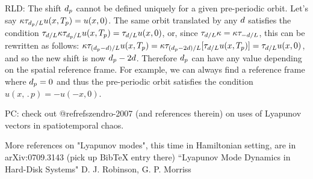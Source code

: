 RLD:{
    The shift $d_p$ cannot be defined
    uniquely for a given pre-periodic orbit.  Let's say
    $\kappa\tau_{d_p/L} u(x,{T_{p}}) = u(x,0)$.  The same
    orbit translated by any $d$ satisfies the condition
    $\tau_{d/L}\kappa\tau_{d_p/L} u(x,{T_{p}}) =
    \tau_{d/L}u(x,0)$, or, since $\tau_{d/L}\kappa = \kappa\tau_{-d/L}$,
    this can be rewritten as follows:
    $\kappa\tau_{(d_p - d)/L}u(x,{T_{p}}) =
    \kappa\tau_{(d_p - 2d)/L}[\tau_{d/L}u(x,{T_{p}})] =
    \tau_{d/L}u(x,0)$, and so the new shift is now $d_p - 2d$.  Therefore
    $d_p$ can have any value depending on the spatial reference frame.  For example,
    we can always find a reference frame where $d_p = 0$ and thus the pre-periodic
    orbit satisfies the condition $u(x,\period{p}) = -u(-x,0)$.
    }

PC: check out @refref{szendro-2007} (and references therein)
    on uses of Lyapunov vectors in spatiotemporal chaos.

More references on "Lyapunov modes", this time in Hamiltonian setting, are in
 arXiv:0709.3143 (pick up BibTeX entry there)
``Lyapunov Mode Dynamics in Hard-Disk Systems"
D. J. Robinson, G. P. Morriss
